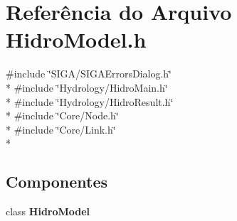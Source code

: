 \section{Referência do Arquivo Hidro\+Model.\+h}
\label{_hidro_model_8h}
{\ttfamily \#include \char`\"{}S\+I\+G\+A/\+S\+I\+G\+A\+Errors\+Dialog.\+h\char`\"{}}\\*
{\ttfamily \#include \char`\"{}Hydrology/\+Hidro\+Main.\+h\char`\"{}}\\*
{\ttfamily \#include \char`\"{}Hydrology/\+Hidro\+Result.\+h\char`\"{}}\\*
{\ttfamily \#include \char`\"{}Core/\+Node.\+h\char`\"{}}\\*
{\ttfamily \#include \char`\"{}Core/\+Link.\+h\char`\"{}}\\*
\subsection*{Componentes}
\begin{DoxyCompactItemize}
\item 
class {\bf Hidro\+Model}
\end{DoxyCompactItemize}
